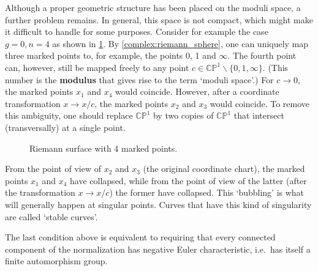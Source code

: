     Although a proper geometric structure has been placed on the moduli space, a further problem remains. In general, this space is not compact, which might make it difficult to handle for some purposes. Consider for example the case $g=0,n=4$ as shown in \cref{fig:riemann_surface_4}. By \cref{complex:riemann_sphere}, one can uniquely map three marked points to, for example, the points 0, 1 and $\infty$. The fourth point can, however, still be mapped freely to any point $c\in\mathbb{CP}^1\backslash\{0,1,\infty\}$. (This number is the \textbf{modulus} that gives rise to the term `moduli space'.) For $c\rightarrow0$, the marked points $x_1$ and $x_4$ would coincide. However, after a coordinate transformation $x\longrightarrow x/c$, the marked points $x_2$ and $x_3$ would coincide. To remove this ambiguity, one should replace $\mathbb{CP}^1$ by two copies of $\mathbb{CP}^1$ that intersect (transversally) at a single point.
    \begin{figure}[ht!]
        \centering
        \caption{Riemann surface with 4 marked points.}
        \label{fig:riemann_surface_4}
    \end{figure}
    From the point of view of $x_2$ and $x_3$ (the original coordinate chart), the marked points $x_1$ and $x_4$ have collapsed, while from the point of view of the latter (after the transformation $x\longrightarrow x/c$) the former have collapsed. This `bubbling' is what will generally happen at singular points. Curves that have this kind of singularity are called `stable curves'.
    \begin{remark}
        The last condition above is equivalent to requiring that every connected component of the normalization has negative Euler characteristic, i.e.~has itself a finite automorphism group.
    \end{remark}


